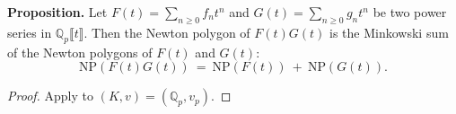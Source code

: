 \begin{theorem}
  \label{thm:newton_polygon_mul_Qp}
  
  \leanok
  \textbf{Proposition.}
  Let $F(t) = \sum_{n \geq 0} f_n t^n$ and $G(t) = \sum_{n \geq 0} g_n t^n$ be two power series in $\mathbb{Q}_p\llbracket t\rrbracket$.
  Then the Newton polygon of $F(t)G(t)$ is the Minkowski sum of the Newton polygons of $F(t)$ and $G(t)$:
  \[
    \mathrm{NP}(F(t)G(t))\ =\ \mathrm{NP}(F(t))\ +\ \mathrm{NP}(G(t)).
  \]
\end{theorem}

\begin{proof}
 
  \leanok
  Apply  to $(K,v)=(\mathbb{Q}_p,v_p)$.
\end{proof}


  



